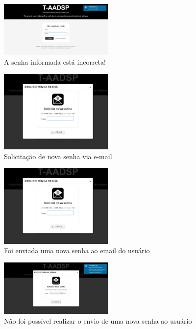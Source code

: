 \documentclass{acm_proc_article-sp}
\begin{document}
\begin{figure}[h]
\centering %
\includegraphics[width=0.5\textwidth]{RF_autenticacao_senha_incorreta.jpg} %
\caption{A senha informada está incorreta! }
\end{figure}

\begin{figure}[h]
\centering %
\includegraphics[width=0.5\textwidth]{RF_autenticacao_solicitar_nova_senha.jpg} %
\caption{Solicitação de nova senha via e-mail }
\end{figure}

\begin{figure}[h]
\centering %
\includegraphics[width=0.5\textwidth]{RF_autenticacao_solicitar_nova_senha.jpg} %
\caption{Foi enviada uma nova senha ao email do usuário }
\end{figure}

\begin{figure}[h]
\centering %
\includegraphics[width=0.5\textwidth]{RF_autenticacao_falha_ao_enviar_senha.jpg} %
\caption{Não foi possível realizar o envio de uma nova senha ao usuário}
\end{figure}
\end{document}
